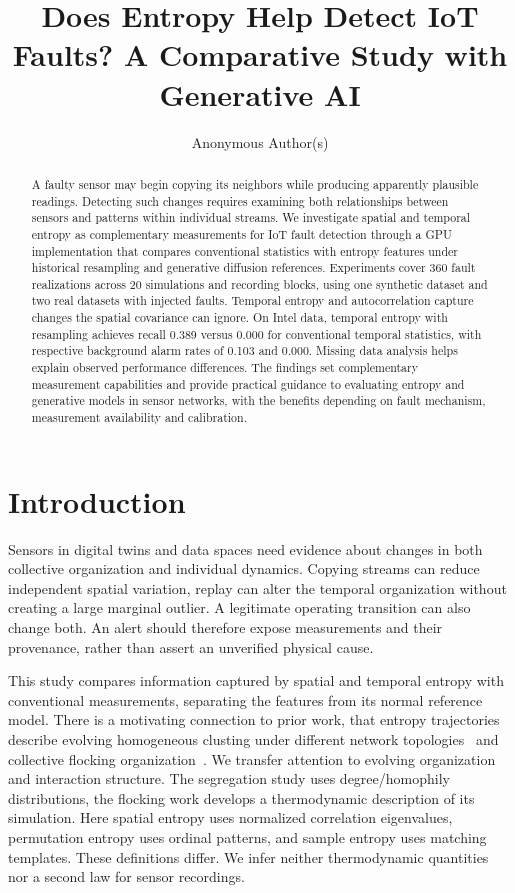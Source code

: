 \documentclass{llncs}
\title{Does Entropy Help Detect IoT Faults? A Comparative Study with Generative AI}
\author{Anonymous Author(s)}
\institute{}
\begin{document}
\maketitle
\begin{abstract}
A faulty sensor may begin copying its neighbors while producing apparently plausible readings. Detecting such changes requires examining both relationships between sensors and patterns within individual streams. We investigate spatial and temporal entropy as complementary measurements for IoT fault detection through a GPU implementation that compares conventional statistics with entropy features under historical resampling and generative diffusion references. Experiments cover 360 fault realizations across 20 simulations and recording blocks, using one synthetic dataset and two real datasets with injected faults. Temporal entropy and autocorrelation capture changes the spatial covariance can ignore. On Intel data, temporal entropy with resampling achieves recall 0.389 versus 0.000 for conventional temporal statistics, with respective background alarm rates of 0.103 and 0.000. Missing data analysis helps explain observed performance differences. The findings set complementary measurement capabilities and provide practical guidance to evaluating entropy and generative models in sensor networks, with the benefits depending on fault mechanism, measurement availability and calibration.
\end{abstract}

\section{Introduction}
Sensors in digital twins and data spaces need evidence about changes in both
collective organization and individual dynamics. Copying streams can reduce
independent spatial variation, replay can alter the temporal organization without
creating a large marginal outlier. A legitimate operating transition can also
change both. An alert should therefore expose measurements and their provenance,
rather than assert an unverified physical cause.

This study compares information captured by spatial and temporal entropy with
conventional measurements, separating the features from its normal reference
model. There is a motivating connection to prior work, that entropy
trajectories describe evolving homogeneous clusting under different network
topologies~\cite{mantzaris2024} and collective flocking
organization~\cite{mantzaris2025}. We transfer attention to evolving organization
and interaction structure. The segregation study uses degree/homophily
distributions, the flocking work develops a thermodynamic description of its
simulation. Here spatial entropy uses normalized correlation eigenvalues,
permutation entropy uses ordinal patterns, and sample entropy uses matching
templates. These definitions differ. We infer neither thermodynamic quantities
nor a second law for sensor recordings.
\end{document}
